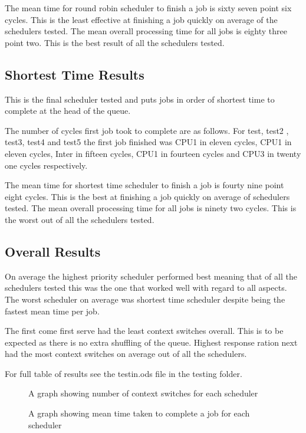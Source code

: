 \documentclass{acm_proc_article-sp}
\begin{document}
The mean time for round robin scheduler to finish a job is sixty seven point six cycles. This is the least effective at finishing a job quickly on average of the schedulers tested. The mean overall processing time for all jobs is eighty three point two. This is the best result of all the schedulers tested.

\subsection{Shortest Time Results}
This is the final scheduler tested and puts jobs in order of shortest time to complete at the head of the queue.

The number of cycles first job took to complete are as follows. For test, test2
, test3, test4 and test5 the first job finished was CPU1 in eleven cycles, CPU1 in eleven cycles, Inter in fifteen cycles, CPU1 in fourteen cycles and CPU3 in twenty one cycles respectively.

The mean time for shortest time scheduler to finish a job is fourty nine point eight cycles. This is the best at finishing a job quickly on average of schedulers tested. The mean overall processing time for all jobs is ninety two cycles. This is the worst out of all the schedulers tested.

\subsection{Overall Results}
On average the highest priority scheduler performed best meaning that of all the schedulers tested this was the one that worked well with regard to all aspects. The worst scheduler on average was shortest time scheduler despite being the fastest mean time per job.

The first come first serve had the least context switches overall. This is to be expected as there is no extra shuffling of the queue. Highest response ration next had the most context switches on average out of all the schedulers.

For full table of results see the testin.ods file in the testing folder.

\begin{figure}
\centering
{}
\caption{A graph showing number of context switches for each scheduler}
\end{figure}

\begin{figure}
\centering
{}
\caption{A graph showing mean time taken to complete a job for each scheduler}
\end{figure}
\end{document}
